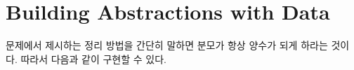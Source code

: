 \chapter{\Large{Building Abstractions with Data}}


문제에서 제시하는 정리 방법을 간단히 말하면 분모가 항상 양수가 되게 하라는
것이다. 따라서 다음과 같이 구현할 수 있다.





